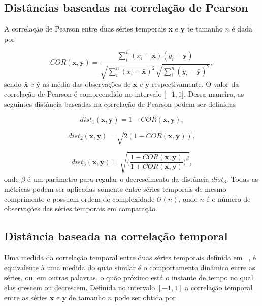 \subsection{Distâncias baseadas na correlação de Pearson}

A correlação de Pearson entre duas séries temporais $\bm{x}$ e $\bm{y}$ te tamanho $n$ é dada por

\begin{equation} \label{d_COR}
COR (\bm{x},\bm{y}) = \frac{\sum_{i}^{n}(x_i-\bm{\bar{x}}) (y_i-\bm{\bar{y}})}{\sqrt{\sum_{i}^{n}(x_i-\bm{\bar{x}})^2}\sqrt{\sum_{i}^{n}(y_i-\bm{\bar{y}})^2}},
\end{equation}
sendo $\bar{\bm{x}}$ e $\bar{\bm{y}}$ as média das observações de $\bm{x}$ e $\bm{y}$ respectivamente. O valor da correlação de Pearson é compreendido no intervalo [$-1,1$]. Dessa maneira, as seguintes distância baseadas na correlação de Pearson podem ser definidas

\begin{equation}
dist_1(\bm{x},\bm{y})  = 1-COR(\bm{x},\bm{y}),
\end{equation}

\begin{equation}
dist_2(\bm{x},\bm{y})  = \sqrt{2(1-COR(\bm{x},\bm{y}))},
\end{equation}

\begin{equation}
dist_3(\bm{x},\bm{y}) = \sqrt{\Bigg(\frac{1-COR(\bm{x},\bm{y})}{1+COR(\bm{x},\bm{y})}\Bigg)^\beta},
\end{equation}
onde $\beta$ é um parâmetro para regular o decrescimento da distância $dist_3$. Todas as métricas podem ser aplicadas somente entre séries temporais de mesmo comprimento e possuem ordem de complexidade $\mathcal{O}(n)$, onde $n$ é o número de observações das séries temporais em comparação. 

\subsection{Distância baseada na correlação temporal}

Uma medida da correlação temporal entre duas séries temporais definida em ~\parencite{cort}, é equivalente à uma medida do quão similar é o comportamento dinâmico entre as séries, ou, em outras palavras, o quão próximo está o instante de tempo no qual elas crescem ou decrescem. Definida no intervalo $[-1,1]$ a correlação temporal entre as séries $\bm{x}$ e $\bm{y}$ de tamanho $n$ pode ser obtida por

